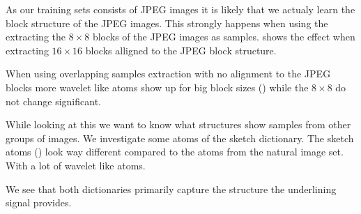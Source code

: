 As our training sets consists of JPEG images it is likely that we actualy learn
the block structure of the JPEG images. This strongly happens when using the
extracting the $8\times 8$ blocks of the JPEG images as samples.
 shows the effect when extracting $16\times 16$
blocks alligned to the JPEG block structure.

When using overlapping samples extraction with no alignment to the JPEG blocks
more wavelet like atoms show up for big block sizes ()
while the $8\times 8$ do not change significant. 

While looking at this we want to know what structures show samples from other
groups of images. We investigate some atoms of the sketch
dictionary.
The sketch atoms () look way different compared to
the atoms from the natural image set. With a lot of wavelet like atoms. 

We see that both dictionaries primarily capture the structure the underlining
signal provides. 

